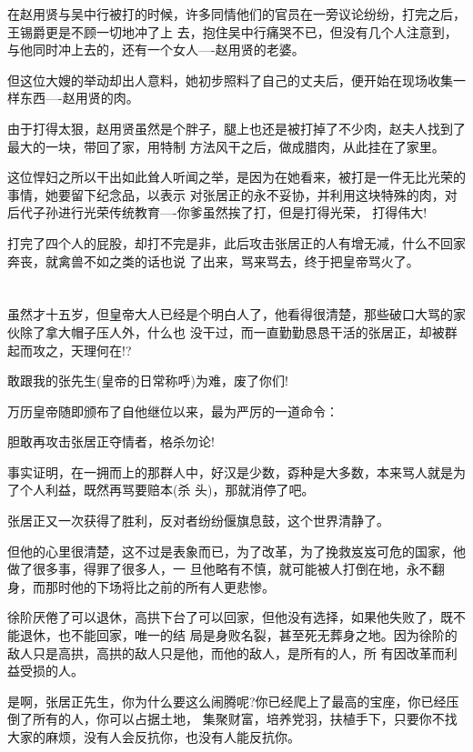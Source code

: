 \documentclass[11pt,a4paper,onecolumn]{article}
\begin{document}
在赵用贤与吴中行被打的时候，许多同情他们的官员在一旁议论纷纷，打完之后，王锡爵更是不顾一切地冲了上
去，抱住吴中行痛哭不已，但没有几个人注意到，与他同时冲上去的，还有一个女人----赵用贤的老婆。

但这位大嫂的举动却出人意料，她初步照料了自己的丈夫后，便开始在现场收集一样东西----赵用贤的肉。

由于打得太狠，赵用贤虽然是个胖子，腿上也还是被打掉了不少肉，赵夫人找到了最大的一块，带回了家，用特制
方法风干之后，做成腊肉，从此挂在了家里。

这位悍妇之所以干出如此耸人听闻之举，是因为在她看来，被打是一件无比光荣的事情，她要留下纪念品，以表示
对张居正的永不妥协，并利用这块特殊的肉，对后代子孙进行光荣传统教育----你爹虽然挨了打，但是打得光荣，
打得伟大!

打完了四个人的屁股，却打不完是非，此后攻击张居正的人有增无减，什么不回家奔丧，就禽兽不如之类的话也说
了出来，骂来骂去，终于把皇帝骂火了。

\section[\thesection]{}

虽然才十五岁，但皇帝大人已经是个明白人了，他看得很清楚，那些破口大骂的家伙除了拿大帽子压人外，什么也
没干过，而一直勤勤恳恳干活的张居正，却被群起而攻之，天理何在!?

敢跟我的张先生(皇帝的日常称呼)为难，废了你们!

万历皇帝随即颁布了自他继位以来，最为严厉的一道命令：

胆敢再攻击张居正夺情者，格杀勿论!

事实证明，在一拥而上的那群人中，好汉是少数，孬种是大多数，本来骂人就是为了个人利益，既然再骂要赔本(杀
头)，那就消停了吧。

张居正又一次获得了胜利，反对者纷纷偃旗息鼓，这个世界清静了。

但他的心里很清楚，这不过是表象而已，为了改革，为了挽救岌岌可危的国家，他做了很多事，得罪了很多人，一
旦他略有不慎，就可能被人打倒在地，永不翻身，而那时他的下场将比之前的所有人更悲惨。

徐阶厌倦了可以退休，高拱下台了可以回家，但他没有选择，如果他失败了，既不能退休，也不能回家，唯一的结
局是身败名裂，甚至死无葬身之地。因为徐阶的敌人只是高拱，高拱的敌人只是他，而他的敌人，是所有的人，所
有因改革而利益受损的人。

是啊，张居正先生，你为什么要这么闹腾呢?你已经爬上了最高的宝座，你已经压倒了所有的人，你可以占据土地，
集聚财富，培养党羽，扶植手下，只要你不找大家的麻烦，没有人会反抗你，也没有人能反抗你。
\end{document}
